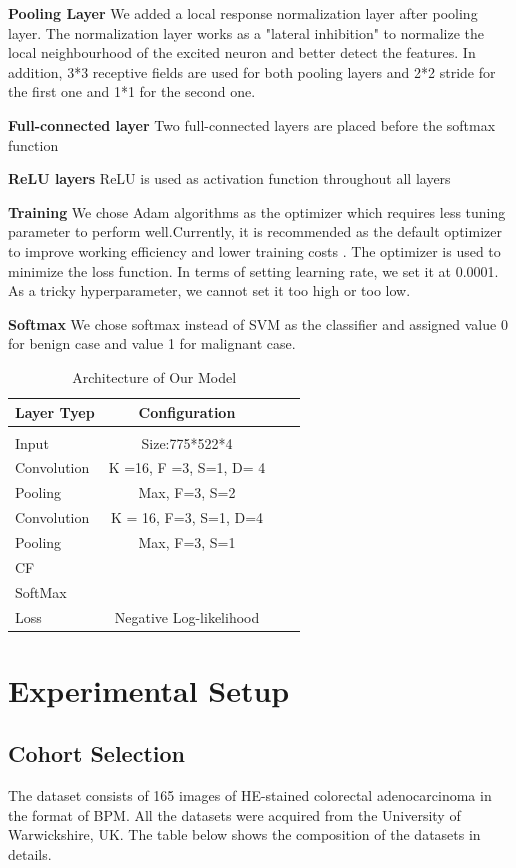 \documentclass[twoside,11pt]{article}
\begin{document}
\textbf{Pooling Layer} We added a local response normalization layer after pooling layer. The normalization layer works as a "lateral inhibition" to normalize the local neighbourhood of the excited neuron and better detect the features. In addition, 3*3 receptive fields are used for both pooling layers and 2*2 stride for the first one and 1*1 for the second one.

\textbf{Full-connected layer} Two full-connected layers are placed before the softmax function

\textbf{ReLU layers} ReLU is used as activation function throughout all layers

\textbf{Training} We chose Adam algorithms as the optimizer which requires less tuning parameter to perform well.Currently, it is recommended as the default optimizer to improve working efficiency and lower training costs \citep{7}. The optimizer is used to minimize the loss function. In terms of setting learning rate, we set it at 0.0001. As a tricky hyperparameter, we cannot set it too high or too low. 

\textbf{Softmax} We chose softmax instead of SVM as the classifier and assigned value 0 for benign case and value 1 for malignant case.


\begin{table}[htbp]
  \centering 
  \begin{tabular}{lclc} 
   Layer Tyep & Configuration \\ 
    \hline \\[-11pt]
    Input & Size:775*522*4\\
    Convolution & K =16, F =3, S=1, D= 4\\
    Pooling & Max, F=3, S=2\\
    Convolution & K = 16, F=3, S=1, D=4 \\
    Pooling & Max, F=3, S=1\\
    CF & \\
    SoftMax & \\
    Loss & Negative Log-likelihood \\\hline
  \end{tabular}
  \label{tab:example} 
    \caption{Architecture of Our Model} 
\end{table}

\section{Experimental Setup} \label{experiment}
\subsection{Cohort Selection} 
The dataset consists of 165 images of HE-stained colorectal adenocarcinoma in the format of BPM. All the datasets were acquired from the University of Warwickshire, UK. The table below shows the composition of the datasets in details.
\end{document}
